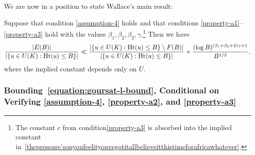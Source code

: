 We are now in a position to state Wallace's main result:
\begin{theorem} \label{theorem:wallace-hit}
	Suppose that condition \ref{assumption-4} holds and that conditions \ref{property-a1}--\ref{property-a3} hold with the values $\beta_1, \beta_2, \beta_3, \gamma$.\footnote{The constant $c$ from condition\ref{property-a3} is absorbed into the implied constant in~\ref{thepressure'sonyoufeelityouvegotitallbelieveitthistimeforafricawhatever}.} Then
we have 	\begin{equation}\label{thepressure'sonyoufeelityouvegotitallbelieveitthistimeforafricawhatever}
			\frac{|E(B)|}{|\{u \in U(K) : \operatorname{Ht}(u) \le B\}|} \ll \frac{|\{u \in U(K) : \operatorname{Ht}(u) \le B\} \setminus F(B)|}{|\{u \in U(K) : \operatorname{Ht}(u) \le B\}|} + \frac{(\log B)^{(\beta_1 + \beta_2 + 2)\gamma +1}}{B^{1/2}},
		\end{equation}
        where the implied constant depends only on $U$.
	\end{theorem}
	
	\subsubsection{Bounding~\ref{equation:goursat-l-bound}, Conditional on Verifying \ref{assumption-4}, \ref{property-a2}, and \ref{property-a3}}

